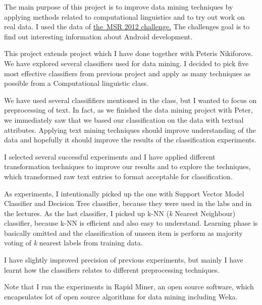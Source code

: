 
The main purpose of this project is to improve data mining techniques by applying
methods related to computational linguistics and to try out work on real data.
I used the data of 
\href{http://2012.msrconf.org/challenge.php}{the~MSR 2012 challenge.} The challenges goal is to find out interesting information about Android development.

This project extends project which I have done together with Peteris Nikiforovs. 
We have explored several classifiers used for data mining.
I decided to pick five most effective classifiers from previous project and apply 
as many techniques as possible from a Computational linguistic class. 

We have used several classififiers mentioned in the class, but I wanted to focus on preprocessing of text. In fact, as we finished the data mining project with Peter, we immediately saw that we based our classification on the data with textual attributes. Applying text mining techniques should improve understanding of the data and hopefully it should improve the results of the classification experiments.

I selected several successful experiments and I have applied different transformation techniques to improve our results
and to explore the techniques, which transformed raw text entries to format acceptable for classification.

As experiments, I intentionally picked up the one with Support Vector Model Classifier and Decision Tree classifier,
because they were used in the labs and in the lectures. As the last classifier, I picked up
 k-NN ({\it k} Nearest Neighbour) classifier, because k-NN is efficient and also easy to understand.
Learning phase is basically omitted and the classification of unseen item is perform as majority voting
of {\it k} nearest labels from training data.

I have slightly improved precision of previous experiments, but mainly
I have learnt how the classifiers relates to different preprocessing techniques. 

Note that I run the experiments in Rapid Miner, an open source software, which encapsulates 
lot of open source algorithms for data mining including Weka. 
